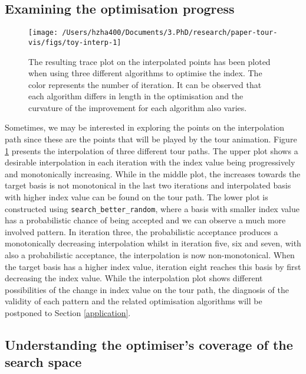 \documentclass[12pt]{article}
\begin{document}
\hypertarget{examining-the-optimisation-progress}{%
\subsection{Examining the optimisation progress}\label{examining-the-optimisation-progress}}

\begin{figure}

{\centering \texttt{[image: /Users/hzha400/Documents/3.PhD/research/paper-tour-vis/figs/toy-interp-1]} 

}

\caption{The resulting trace plot on the interpolated points has been ploted when using three different algorithms to optimise the index. The color represents the number of iteration. It can be observed that each algorithm differs in length in the optimisation and the curvature of the improvement for each algorithm also varies.}\label{fig:toy-interp}
\end{figure}



Sometimes, we may be interested in exploring the points on the interpolation path since these are the points that will be played by the tour animation. Figure \ref{fig:toy-interp} presents the interpolation of three different tour paths. The upper plot shows a desirable interpolation in each iteration with the index value being progressively and monotonically increasing. While in the middle plot, the increases towards the target basis is not monotonical in the last two iterations and interpolated basis with higher index value can be found on the tour path. The lower plot is constructed using \texttt{search\_better\_random}, where a basis with smaller index value has a probabilistic chance of being accepted and we can observe a much more involved pattern. In iteration three, the probabilistic acceptance produces a monotonically decreasing interpolation whilst in iteration five, six and seven, with also a probabilistic acceptance, the interpolation is now non-monotonical. When the target basis has a higher index value, iteration eight reaches this basis by first decreasing the index value. While the interpolation plot shows different possibilities of the change in index value on the tour path, the diagnosis of the validity of each pattern and the related optimisation algorithms will be postponed to Section \ref{application}.

\hypertarget{understanding-the-optimisers-coverage-of-the-search-space}{%
\subsection{Understanding the optimiser's coverage of the search space}\label{understanding-the-optimisers-coverage-of-the-search-space}}
\end{document}
